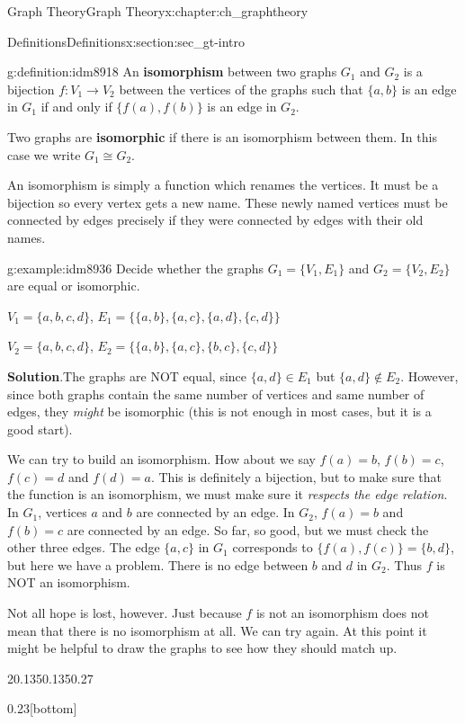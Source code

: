 \documentclass[oneside,10pt,]{book}
\newcommand{\terminology}[1]{\textbf{#1}}
\numberwithin{equation}{chapter}
\def\isom{\cong}
\begin{document}
\begin{chapterptx}{Graph Theory}{}{Graph Theory}{}{}{x:chapter:ch_graphtheory}
\begin{sectionptx}{Definitions}{}{Definitions}{}{}{x:section:sec_gt-intro}
\begin{definition}{}{g:definition:idm8918}%
 An \terminology{isomorphism} between two graphs \(G_1\) and \(G_2\) is a bijection \(f:V_1 \to V_2\) between the vertices of the graphs such that \(\{a,b\}\) is an edge in \(G_1\) if and only if \(\{f(a), f(b)\}\) is an edge in \(G_2\).%
\par
Two graphs are \terminology{isomorphic} if there is an isomorphism between them. In this case we write \(G_1 \isom G_2\).%
\end{definition}
An isomorphism is simply a function which renames the vertices. It must be a bijection so every vertex gets a new name. These newly named vertices must be connected by edges precisely if they were connected by edges with their old names.%
\begin{example}{}{g:example:idm8936}%
Decide whether the graphs \(G_1 = \{V_1, E_1\}\) and \(G_2 = \{V_2, E_2\}\) are equal or isomorphic.%
\par
\(V_1 = \{a,b,c,d\}\), \(E_1 = \{\{a,b\}, \{a,c\}, \{a,d\}, \{c,d\}\}\)%
\par
\(V_2 = \{a,b,c,d\}\), \(E_2 = \{\{a,b\}, \{a,c\}, \{b,c\}, \{c,d\}\}\)%
\par\smallskip%
\noindent\textbf{Solution}.\hypertarget{g:solution:idm8947}{}\quad{}The graphs are NOT equal, since \(\{a,d\} \in E_1\) but \(\{a,d\} \notin E_2\). However, since both graphs contain the same number of vertices and same number of edges, they \emph{might} be isomorphic (this is not enough in most cases, but it is a good start).%
\par
We can try to build an isomorphism. How about we say \(f(a) = b\), \(f(b) = c\), \(f(c) = d\) and \(f(d) = a\). This is definitely a bijection, but to make sure that the function is an isomorphism, we must make sure it \emph{respects the edge relation}. In \(G_1\), vertices \(a\) and \(b\) are connected by an edge. In \(G_2\), \(f(a) = b\) and \(f(b) = c\) are connected by an edge. So far, so good, but we must check the other three edges. The edge \(\{a,c\}\) in \(G_1\) corresponds to \(\{f(a), f(c)\} = \{b,d\}\), but here we have a problem. There is no edge between \(b\) and \(d\) in \(G_2\). Thus \(f\) is NOT an isomorphism.%
\par
Not all hope is lost, however. Just because \(f\) is not an isomorphism does not mean that there is no isomorphism at all. We can try again. At this point it might be helpful to draw the graphs to see how they should match up.%
\begin{sidebyside}{2}{0.135}{0.135}{0.27}%
\begin{sbspanel}{0.23}[bottom]%
\end{sbspanel}
\end{sidebyside}
\end{example}
\end{sectionptx}
\end{chapterptx}
\end{document}
